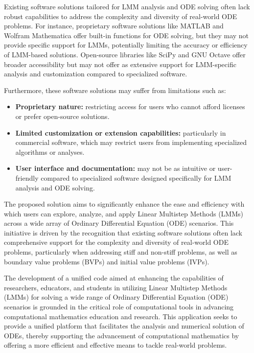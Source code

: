 Existing software solutions tailored for LMM analysis and ODE solving often lack robust capabilities to address the complexity and diversity of real-world ODE problems. For instance, proprietary software solutions like MATLAB and Wolfram Mathematica offer built-in functions for ODE solving, but they may not provide specific support for LMMs, potentially limiting the accuracy or efficiency of LMM-based solutions. Open-source libraries like SciPy and GNU Octave offer broader accessibility but may not offer as extensive support for LMM-specific analysis and customization compared to specialized software.

Furthermore, these software solutions may suffer from limitations such as:

\begin{itemize}
    \item \textbf{Proprietary nature:} restricting access for users who cannot afford licenses or prefer open-source solutions.
    \item \textbf{Limited customization or extension capabilities:} particularly in commercial software, which may restrict users from implementing specialized algorithms or analyses.
    \item \textbf{User interface and documentation:} may not be as intuitive or user-friendly compared to specialized software designed specifically for LMM analysis and ODE solving.
\end{itemize}

The proposed solution aims to significantly enhance the ease and efficiency with which users can explore, analyze, and apply Linear Multistep Methods (LMMs) across a wide array of Ordinary Differential Equation (ODE) scenarios. This initiative is driven by the recognition that existing software solutions often lack comprehensive support for the complexity and diversity of real-world ODE problems, particularly when addressing stiff and non-stiff problems, as well as boundary value problems (BVPs) and initial value problems (IVPs).

The development of a unified code aimed at enhancing the capabilities of researchers, educators, and students in utilizing Linear Multistep Methods (LMMs) for solving a wide range of Ordinary Differential Equation (ODE) scenarios is grounded in the critical role of computational tools in advancing computational mathematics education and research. This application seeks to provide a unified platform that facilitates the analysis and numerical solution of ODEs, thereby supporting the advancement of computational mathematics by offering a more efficient and effective means to tackle real-world problems.

